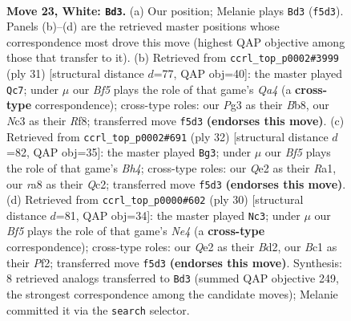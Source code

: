 \documentclass[11pt]{article}
\begin{document}
\clearpage

\begin{figure}[p]\centering
\begin{subfigure}{0.46\textwidth}\centering
\resizebox{\linewidth}{!}{%
\newchessgame
\chessboard[
  setfen={r1bq1rk1/2pn1pb1/1p1p1n2/3P1B1p/p1P5/P1N3P1/1PN1Q2P/1RB2RK1 w - - 1 23},
  showmover=false,
  pgfstyle=straightmove, color=movearrow, markmove={f5-d3}
]}
\caption{}
\end{subfigure}\hfill
\begin{subfigure}{0.46\textwidth}\centering
\resizebox{\linewidth}{!}{%
\newchessgame
\chessboard[
  setfen={rb3rk1/1b1n1pp1/2p1pn1p/qp6/3PN3/2NBP3/P1QB1PPP/R2R2K1 b - - 1 16},
  showmover=false,
  pgfstyle=straightmove, color=movearrow, markmove={a5-c7}
]}
\caption{}
\end{subfigure}
\\[4pt]
\begin{subfigure}{0.46\textwidth}\centering
\resizebox{\linewidth}{!}{%
\newchessgame
\chessboard[
  setfen={2r1r1k1/pb1nbpp1/4qn1p/2pp4/7B/P1N1PN2/1PQ1BPPP/R2R2K1 w - - 8 17},
  showmover=false,
  pgfstyle=straightmove, color=movearrow, markmove={h4-g3}
]}
\caption{}
\end{subfigure}\hfill
\begin{subfigure}{0.46\textwidth}\centering
\resizebox{\linewidth}{!}{%
\newchessgame
\chessboard[
  setfen={r2q1rk1/pp1nbppp/2p1pn2/8/3PN3/P2B1Q2/1PPB1PPP/R3R1K1 w - - 9 16},
  showmover=false,
  pgfstyle=straightmove, color=movearrow, markmove={e4-c3}
]}
\caption{}
\end{subfigure}
\caption{\textbf{Move 23, White: \texttt{Bd3}.} (a) Our position; Melanie plays \texttt{Bd3} (\texttt{f5d3}). Panels (b)--(d) are the retrieved master positions whose correspondence most drove this move (highest QAP objective among those that transfer to it). (b) Retrieved from \texttt{ccrl\_top\_p0002\#3999} (ply 31) [structural distance $d$=77, QAP obj=40]: the master played \texttt{Qc7}; under $\mu$ our \emph{Bf5} plays the role of that game's \emph{Qa4} (a \textbf{cross-type} correspondence); cross-type roles: our \emph{P}g3 as their \emph{B}b8, our \emph{N}c3 as their \emph{R}f8; transferred move \texttt{f5d3} \textbf{(endorses this move)}. (c) Retrieved from \texttt{ccrl\_top\_p0002\#691} (ply 32) [structural distance $d$=82, QAP obj=35]: the master played \texttt{Bg3}; under $\mu$ our \emph{Bf5} plays the role of that game's \emph{Bh4}; cross-type roles: our \emph{Q}e2 as their \emph{R}a1, our \emph{r}a8 as their \emph{Q}c2; transferred move \texttt{f5d3} \textbf{(endorses this move)}. (d) Retrieved from \texttt{ccrl\_top\_p0000\#602} (ply 30) [structural distance $d$=81, QAP obj=34]: the master played \texttt{Nc3}; under $\mu$ our \emph{Bf5} plays the role of that game's \emph{Ne4} (a \textbf{cross-type} correspondence); cross-type roles: our \emph{Q}e2 as their \emph{B}d2, our \emph{B}c1 as their \emph{P}f2; transferred move \texttt{f5d3} \textbf{(endorses this move)}. Synthesis: 8 retrieved analogs transferred to \texttt{Bd3} (summed QAP objective 249, the strongest correspondence among the candidate moves); Melanie committed it via the \texttt{search} selector.}
\label{fig:thought-m44}
\end{figure}
\end{document}
